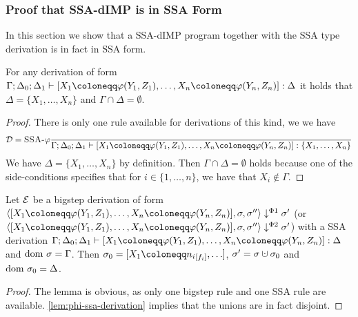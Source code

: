 \subsubsection*{Proof that SSA-dIMP is in SSA Form}
In this section we show that a SSA-dIMP program together with the SSA type derivation
is in fact in SSA form.
\begin{lemma}
    \label{lem:phi-ssa-derivation}
    For any derivation of form $\typestep{\Gamma;\Delta_0;\Delta_1}{\defaultphilistn}{\Delta}$
    it holds that $\Delta = \{X_1, \ldots, X_n\}$ and $\Gamma \cap \Delta = \emptyset$.
\end{lemma}
\begin{proof}
    There is only one rule available for derivations of this kind, we we have
    \begin{align*}
        \D = \rule{SSA-$\varphi$}{}{\typestep{\Gamma;\Delta_0;\Delta_1}{\defaultphilistn}{\{X_1, \ldots, X_n\}}}
    \end{align*}
    We have $\Delta = \{X_1, \ldots, X_n\}$ by definition.
    Then $\Gamma \cap \Delta = \emptyset$ holds because one of the side-conditions
    specifies that for $i \in \{1, \ldots, n\}$, we have that $X_i \notin \Gamma$.
\end{proof}

\begin{lemma}
    \label{lem:phi-bs-derivation}
    Let $\operatorname{\mathcal{E}}$ be a bigstep derivation of form $\bigsteppl{\defaultphilistn}{\store}{\store''}{\store'}$
    (or $\bigsteppr{\defaultphilistn}{\store}{\store''}{\store'}$)
    with a SSA derivation $\typestep{\Gamma;\Delta_0;\Delta_1}{\defaultphilistn}{\Delta}$
    and $\text{dom }{\sigma} = \Gamma$.
    Then $\store_0 = [X_1 \coloneqq \flagged[n_i][i], \ldots]$, $\store' = \store \dunion \store_0$
    and $\text{dom }{\sigma_0} = \Delta$.
\end{lemma}
\begin{proof}
    The lemma is obvious, as only one bigstep rule and one SSA rule are available.
    \autoref{lem:phi-ssa-derivation} implies that the unions are in fact disjoint.
\end{proof}

